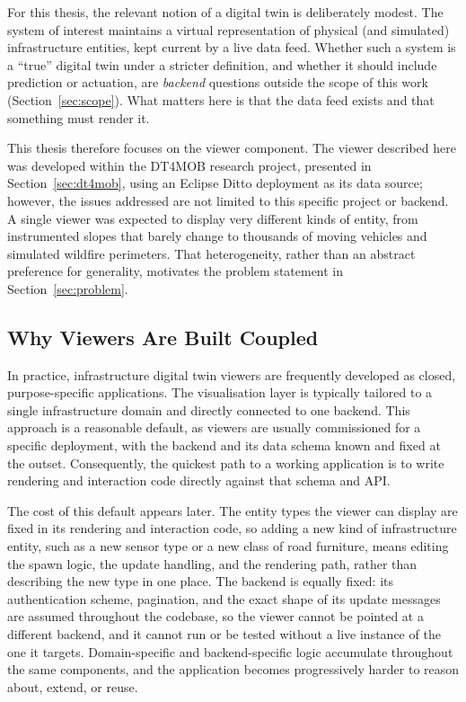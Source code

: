 For this thesis, the relevant notion of a digital twin is deliberately modest. The system of interest maintains a virtual representation of physical (and simulated) infrastructure entities, kept current by a live data feed. Whether such a system is a ``true'' digital twin under a stricter definition, and whether it should include prediction or actuation, are \emph{backend} questions outside the scope of this work (Section~\ref{sec:scope}). What matters here is that the data feed exists and that something must render it.

This thesis therefore focuses on the viewer component. The viewer described here was developed within the DT4MOB research project, presented in Section~\ref{sec:dt4mob}, using an Eclipse Ditto deployment as its data source; however, the issues addressed are not limited to this specific project or backend. A single viewer was expected to display very different kinds of entity, from instrumented slopes that barely change to thousands of moving vehicles and simulated wildfire perimeters. That heterogeneity, rather than an abstract preference for generality, motivates the problem statement in Section~\ref{sec:problem}.

\subsection{Why Viewers Are Built Coupled}

In practice, infrastructure digital twin viewers are frequently developed as closed, purpose-specific applications. The visualisation layer is typically tailored to a single infrastructure domain and directly connected to one backend. This approach is a reasonable default, as viewers are usually commissioned for a specific deployment, with the backend and its data schema known and fixed at the outset. Consequently, the quickest path to a working application is to write rendering and interaction code directly against that schema and API.

The cost of this default appears later. The entity types the viewer can display are fixed in its rendering and interaction code, so adding a new kind of infrastructure entity, such as a new sensor type or a new class of road furniture, means editing the spawn logic, the update handling, and the rendering path, rather than describing the new type in one place. The backend is equally fixed: its authentication scheme, pagination, and the exact shape of its update messages are assumed throughout the codebase, so the viewer cannot be pointed at a different backend, and it cannot run or be tested without a live instance of the one it targets. Domain-specific and backend-specific logic accumulate throughout the same components, and the application becomes progressively harder to reason about, extend, or reuse.

